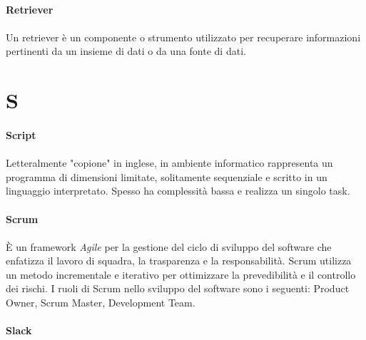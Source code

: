\documentclass[10pt, a4paper]{article}
\begin{document}
\vspace{2em}
\paragraph{Retriever}\noindent\hrulefill
\paragraph{}Un retriever è un componente o strumento utilizzato per recuperare informazioni pertinenti da un insieme di dati o da una fonte di dati.



\newpage
\section{S}

\vspace{2em}
\paragraph{Script}\noindent\hrulefill
\paragraph{}Letteralmente "copione" in inglese, in ambiente informatico rappresenta un programma di dimensioni limitate, solitamente sequenziale e scritto in un linguaggio interpretato. Spesso ha complessità bassa e realizza un singolo task.

\vspace{2em}
\paragraph{Scrum}\noindent\hrulefill
\paragraph{}È un framework  \textit{Agile\pg} per la gestione del ciclo di sviluppo del software che enfatizza il lavoro di squadra, la trasparenza e la responsabilità. Scrum utilizza un metodo incrementale e iterativo per ottimizzare la prevedibilità e il controllo dei rischi.
I ruoli di Scrum nello sviluppo del software sono i seguenti: Product Owner, Scrum Master, Development Team.


\vspace{2em}
\paragraph{Slack}\noindent\hrulefill
\end{document}
